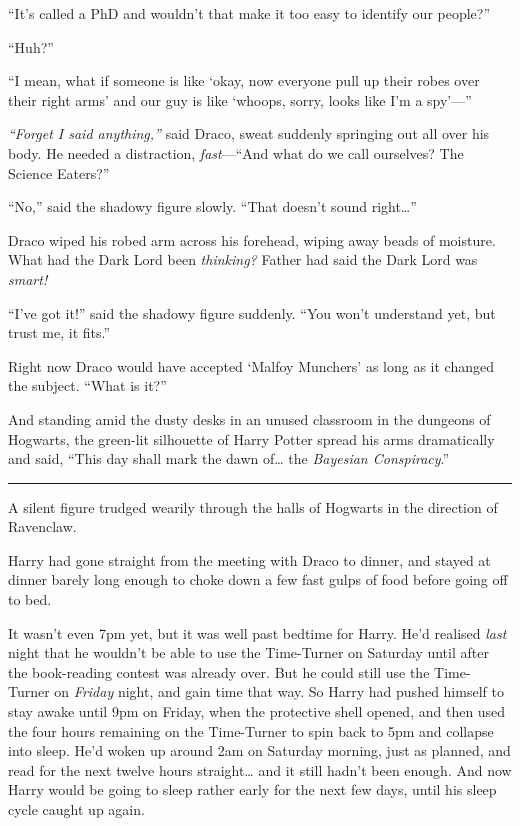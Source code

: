 ``It's called a PhD and wouldn't that make it too easy to identify our
people?''

``Huh?''

``I mean, what if someone is like `okay, now everyone pull up their
robes over their right arms' and our guy is like `whoops, sorry, looks
like I'm a spy'---''

\emph{``Forget I said anything,''} said Draco, sweat suddenly springing
out all over his body. He needed a distraction, \emph{fast}---``And what
do we call ourselves? The Science Eaters?''

``No,'' said the shadowy figure slowly. ``That doesn't sound
right\ldots{}''

Draco wiped his robed arm across his forehead, wiping away beads of
moisture. What had the Dark Lord been \emph{thinking?} Father had said
the Dark Lord was \emph{smart!}

``I've got it!'' said the shadowy figure suddenly. ``You won't
understand yet, but trust me, it fits.''

Right now Draco would have accepted `Malfoy Munchers' as long as it
changed the subject. ``What is it?''

And standing amid the dusty desks in an unused classroom in the dungeons
of Hogwarts, the green-lit silhouette of Harry Potter spread his arms
dramatically and said, ``This day shall mark the dawn of\ldots{} the
\emph{Bayesian Conspiracy}.''

\begin{center}\rule{3in}{0.4pt}\end{center}

A silent figure trudged wearily through the halls of Hogwarts in the
direction of Ravenclaw.

Harry had gone straight from the meeting with Draco to dinner, and
stayed at dinner barely long enough to choke down a few fast gulps of
food before going off to bed.

It wasn't even 7pm yet, but it was well past bedtime for Harry. He'd
realised \emph{last} night that he wouldn't be able to use the
Time-Turner on Saturday until after the book-reading contest was already
over. But he could still use the Time-Turner on \emph{Friday} night, and
gain time that way. So Harry had pushed himself to stay awake until 9pm
on Friday, when the protective shell opened, and then used the four
hours remaining on the Time-Turner to spin back to 5pm and collapse into
sleep. He'd woken up around 2am on Saturday morning, just as planned,
and read for the next twelve hours straight\ldots{} and it still hadn't
been enough. And now Harry would be going to sleep rather early for the
next few days, until his sleep cycle caught up again.


